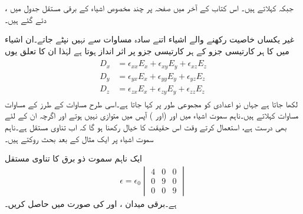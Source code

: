  ،   جبکہ     کہلاتے ہیں۔ اس کتاب کے آخر میں صفحہ  پر  چند مخصوص اشیاء کے برقی مستقل جدول  میں دئے گئے ہیں۔

غیر یکساں خاصیت رکھنے والے اشیاء اتنے سادہ مساوات سے نہیں نپٹے جاتے۔ان اشیاء میں  کا ہر کارتیسی جزو    کے ہر کارتیسی جزو پر اثر انداز ہوتا ہے لہٰذا ان کا تعلق یوں
\begin{gather}
\begin{aligned}\label{مساوت_کپیسٹر_تناوی-مساوات}
D_x&=\epsilon_{xx} E_x +\epsilon_{xy} E_y+\epsilon_{xz} E_z\\
D_y&=\epsilon_{yx} E_x +\epsilon_{yy} E_y+\epsilon_{yz} E_z\\
D_z&=\epsilon_{zx} E_x +\epsilon_{zy} E_y+\epsilon_{zz} E_z
\end{aligned}
\end{gather}
لکھا جاتا ہے جہاں نو اعدادی  کو مجموعی طور پر  کہا جاتا ہے۔اسی طرح مساوات  کے طرز کے مساوات  مساوات کہلاتے ہیں۔ناہم سموت اشیاء میں  اور   (اور ) آپس میں متوازی نہیں  ہوتے اور اگرچہ  ان کے لئے بھی درست ہے،  استعمال کرتے وقت  اس حقیقت کا خیال رکھنا ہو گا کہ  اب تناوی مستقل ہے۔ناہم سموت اشیاء پر ایک مثال کے بعد بحث روکتے ہیں۔

ایک ناہم سموت ذو برق کا تناوی مستقل
\begin{align*}
\epsilon=\epsilon_0 
\begin{vmatrix}
4 & 0 & 0 \\
0 & 9 & 0\\
0 & 0 &9
\end{vmatrix}
\end{align*}
ہے۔برقی میدان ،  اور  کی صورت میں  حاصل کریں۔

